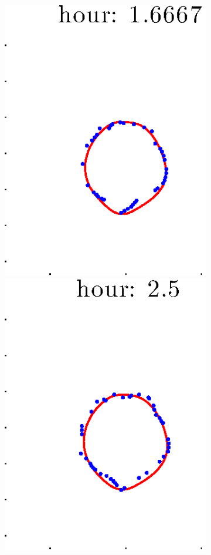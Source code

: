 \documentclass[12pt]{article}
\begin{document}
\begin{figure}[h!]
\begin{subfigure}[b]{.3\textwidth}
		\includegraphics[height=.15\textheight]{Pos14exp8/firsthalf/first3.eps}
		\includegraphics[height=.15\textheight]{Pos14exp8/firsthalf/first4.eps}

\end{subfigure}
\end{figure}
\end{document}
